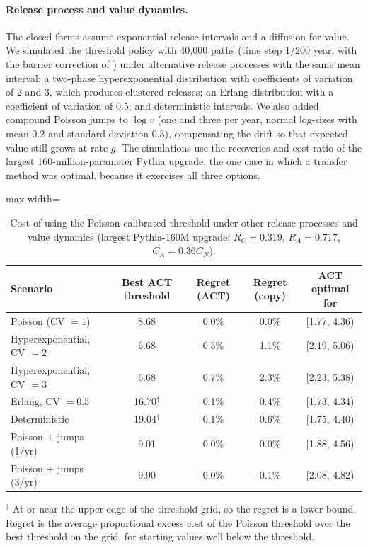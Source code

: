 \documentclass[preprint,12pt,authoryear]{elsarticle}
\begin{document}
\paragraph{Release process and value dynamics.} The closed forms assume exponential release intervals and a diffusion for value. We simulated the threshold policy with 40{,}000 paths (time step $1/200$ year, with the barrier correction of \citealt{broadie1997continuity}) under alternative release processes with the same mean interval: a two-phase hyperexponential distribution with coefficients of variation of 2 and 3, which produces clustered releases; an Erlang distribution with a coefficient of variation of 0.5; and deterministic intervals. We also added compound Poisson jumps to $\log v$ (one and three per year, normal log-sizes with mean 0.2 and standard deviation 0.3), compensating the drift so that expected value still grows at rate $g$. The simulations use the recoveries and cost ratio of the largest 160-million-parameter Pythia upgrade, the one case in which a transfer method was optimal, because it exercises all three options.

\begin{table}[t]
\centering
\caption{Cost of using the Poisson-calibrated threshold under other release processes and value dynamics (largest Pythia-160M upgrade; $R_C=0.319$, $R_A=0.717$, $C_A=0.36C_N$).}\label{tab:robust}
\small
\begin{adjustbox}{max width=\textwidth}
\begin{tabular}{lcccc}
\toprule
Scenario & Best ACT threshold & Regret (ACT) & Regret (copy) & ACT optimal for\\
\midrule
Poisson (CV $=1$) & 8.68 & 0.0\% & 0.0\% & [1.77, 4.36)\\
Hyperexponential, CV $=2$ & 6.68 & 0.5\% & 1.1\% & [2.19, 5.06)\\
Hyperexponential, CV $=3$ & 6.68 & 0.7\% & 2.3\% & [2.23, 5.38)\\
Erlang, CV $=0.5$ & 16.70$^\dagger$ & 0.1\% & 0.4\% & [1.73, 4.34)\\
Deterministic & 19.04$^\dagger$ & 0.1\% & 0.6\% & [1.75, 4.40)\\
Poisson + jumps (1/yr) & 9.01 & 0.0\% & 0.0\% & [1.88, 4.56)\\
Poisson + jumps (3/yr) & 9.90 & 0.0\% & 0.1\% & [2.08, 4.82)\\
\bottomrule
\end{tabular}
\end{adjustbox}

\smallskip\footnotesize $^\dagger$ At or near the upper edge of the threshold grid, so the regret is a lower bound. Regret is the average proportional excess cost of the Poisson threshold over the best threshold on the grid, for starting values well below the threshold.
\end{table}
\end{document}

